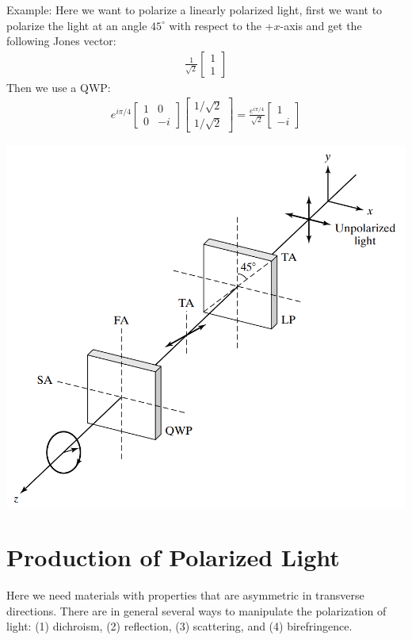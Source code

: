 \documentclass[11pt]{book}
\theoremstyle{break}
\theoremstyle{break}
\newcommand{\bmat}[1]{\begin{bmatrix} #1 \end{bmatrix}}
\newcommand{\example}{\color{green}Example: \color{black}}
\begin{document}
\example
Here we want to polarize a linearly polarized light, first we want to polarize the light at an angle $45^\circ$ with respect to the +$x$-axis and get the following Jones vector:
\begin{align*}
\frac{1}{\sqrt{2}} \bmat{1 \\ 1}
\end{align*}
Then we use a QWP:
\begin{align*}
e^{i\pi/4}\bmat{1 & 0 \\ 0 & -i}\bmat{1/\sqrt{2} \\ 1/\sqrt{2}} = \frac{e^{i\pi/4}}{\sqrt{2}}\bmat{1 \\ -i}
\end{align*}
\hfill\break
\hfill\break
\begin{center}
\includegraphics[scale=0.5]{circularPol}
\end{center}

\newpage
\section[Production of Polarized Light]{\color{red}Production of Polarized Light\color{black}}
Here we need materials with properties that are asymmetric in transverse directions. There are in general several ways to manipulate the polarization of light: (1) dichroism, (2) reflection, (3) scattering, and (4) birefringence.\\
\end{document}
